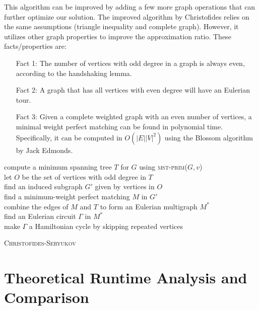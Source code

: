 \documentclass[11pt]{article}
\begin{document}
  This algorithm can be improved by adding a few more graph operations that can further optimize our solution.
  The improved algorithm by Christofides relies on the same assumptions (triangle inequality and complete graph). 
  However, it utilizes other graph properties to improve the approximation ratio. These facts/properties are:
  \begin{enumerate}
    \item[Fact 1:] The number of vertices with odd degree in a graph is always even, according to the handshaking lemma. 
    \item[Fact 2:] A graph that has all vertices with even degree will have an Eulerian tour. 
    \item[Fact 3:] Given a complete weighted graph with an even number of vertices, a minimal weight perfect matching can be found in polynomial 
     time. Specifically, it can be computed in $O(|E||V|^2)$  using the Blossom algorithm by Jack Edmonds.
  \end{enumerate} 
  \begin{algorithm*}
    compute a minimum spanning tree $T$ for $G$ using \textsc{mst-prim}($G, v$) \\
    let $O$ be the set of vertices with odd degree in $T$ \\
    find an induced subgraph $G'$ given by vertices in $O$ \\
    find a minimum-weight perfect matching $M$ in $G'$ \\
    combine the edges of $M$ and $T$ to form an Eulerian multigraph $M^*$ \\
    find an Eulerian circuit $\Gamma$ in $M^*$ \\
    make $\Gamma$ a Hamiltonian cycle by skipping repeated vertices \\
    \caption{\textsc{Christofides-Seryukov}}
\end{algorithm*}

  
\section{Theoretical Runtime Analysis and Comparison}
\end{document}
